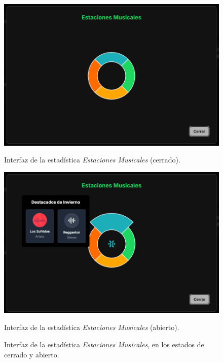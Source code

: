 \begin{figure}[H]
  \centering
  \vspace{-10pt}
  \begin{minipage}{0.47\textwidth}
    \centering
    \includegraphics[width=\textwidth]{figures/capturas_ui/estaciones_musicales_cerrado.png}
    \caption{Interfaz de la estadística \textit{Estaciones Musicales} (cerrado).}
    \label{fig:estaciones_musicales_cerrado}
  \end{minipage}
  \begin{minipage}{0.47\textwidth}
    \centering
    \includegraphics[width=\textwidth]{figures/capturas_ui/estaciones_musicales_abierto.png}
    \caption{Interfaz de la estadística \textit{Estaciones Musicales} (abierto).}
    \label{fig:estaciones_musicales_abierto}
  \end{minipage}
  \caption{Interfaz de la estadística \textit{Estaciones Musicales}, en los estados de cerrado y abierto.}
  \label{fig:estaciones_musicales}
\end{figure}

